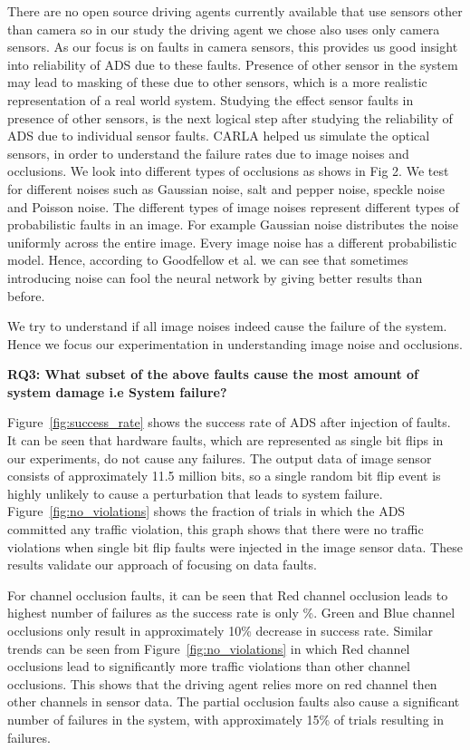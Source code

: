 There are no open source driving agents currently available that use sensors other than camera so in our study the driving agent we chose also uses only camera sensors. As our focus is on faults in camera sensors, this provides us good insight into reliability of ADS due to these faults. Presence of other sensor in the system may lead to masking of these due to other sensors, which is a more realistic representation of a real world system. Studying the effect sensor faults in presence of other sensors, is the next logical step after studying the reliability of ADS due to individual sensor faults.  
CARLA helped us simulate the optical sensors, in order to understand the failure rates due to image noises and occlusions. We look into different types of occlusions as shows in Fig 2. We test for different noises such as Gaussian noise, salt and pepper noise, speckle noise and Poisson noise. The different types of image noises represent different types of probabilistic faults in an image. For example Gaussian noise distributes the noise uniformly across the entire image. Every image noise has a different probabilistic model. Hence, according to Goodfellow et al.\cite{2014arXiv1412.6572G} we can see that sometimes introducing noise can fool the neural network by giving better results than before. 

We try to understand if all image noises indeed cause the failure of the system. Hence we focus our experimentation in understanding image noise and occlusions.

\textbf{RQ3: What subset of the above faults cause the most amount of system damage i.e System failure?}

Figure~\ref{fig:success_rate} shows the success rate of ADS after injection of faults. It can be seen that hardware faults, which are represented as single bit flips in our experiments, do not cause any failures. The output data of image sensor consists of approximately 11.5 million bits, so a single random bit flip event is highly unlikely to cause a perturbation that leads to system failure. Figure~\ref{fig:no_violations} shows the fraction of trials in which the ADS committed any traffic violation, this graph shows that there were no traffic violations when single bit flip faults were injected in the image sensor data. These results validate our approach of focusing on data faults.

For channel occlusion faults, it can be seen that Red channel occlusion leads to highest number of failures as the success rate is only \%. Green and Blue channel occlusions only result in approximately 10\% decrease in success rate. Similar trends can be seen from Figure~\ref{fig:no_violations} in which Red channel occlusions lead to significantly more traffic violations than other channel occlusions. This shows that the driving agent relies more on red channel then other channels in sensor data. The partial occlusion faults also cause a significant number of failures in the system, with approximately 15\% of trials resulting in failures.

